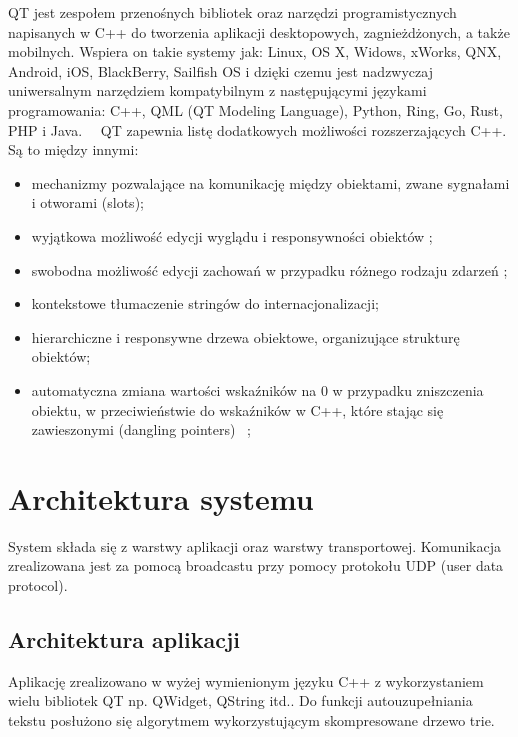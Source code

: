 \documentclass[twoside,a4paper]{book}
\begin{document}
QT jest zespołem przenośnych bibliotek oraz narzędzi programistycznych napisanych w C++ do tworzenia aplikacji desktopowych, zagnieżdżonych, a także mobilnych. Wspiera on takie systemy jak: Linux, OS X, Widows, xWorks, QNX, Android, iOS, BlackBerry, Sailfish OS i dzięki czemu jest nadzwyczaj uniwersalnym narzędziem kompatybilnym z następującymi językami programowania: C++, QML (QT Modeling Language), Python, Ring, Go, Rust, PHP i Java.~\cite{qtAbout}~\cite{qtLang}
QT zapewnia listę dodatkowych możliwości rozszerzających C++. Są to między innymi: \begin{itemize}
\item mechanizmy pozwalające na komunikację między obiektami, zwane sygnałami i otworami (slots);
\item wyjątkowa możliwość edycji wyglądu i responsywności obiektów ;
\item swobodna możliwość edycji zachowań w przypadku różnego rodzaju zdarzeń ;
\item kontekstowe tłumaczenie stringów do internacjonalizacji;
\item hierarchiczne i responsywne drzewa obiektowe, organizujące strukturę obiektów;
\item automatyczna zmiana wartości wskaźników na 0 w przypadku zniszczenia obiektu, w przeciwieństwie do wskaźników w C++, które stając się za\-wie\-szo\-ny\-mi (dangling pointers) 
~\cite{qtLang};
\end{itemize}

\section{Architektura systemu}
System składa się z warstwy aplikacji oraz warstwy transportowej. Komunikacja zrealizowana jest za pomocą broadcastu przy pomocy protokołu UDP (user data protocol). 

\subsection{Architektura aplikacji}
Aplikację zrealizowano w wyżej wymienionym języku C++ z wykorzystaniem wielu bibliotek QT np. QWidget, QString itd.. Do funkcji autouzupełniania tekstu posłużono się algorytmem wykorzystującym skompresowane drzewo trie. 
\end{document}
